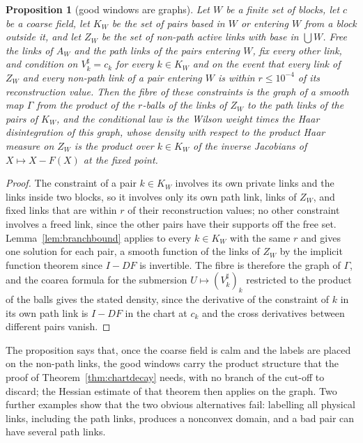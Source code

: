\documentclass[11pt]{amsart}
\newtheorem{proposition}[theorem]{Proposition}
\theoremstyle{definition}
\theoremstyle{remark}
\numberwithin{equation}{section}
\begin{document}
\begin{proposition}[good windows are graphs]\label{prop:graphlaw}
Let $W$ be a finite set of blocks, let $c$ be a coarse field, let $K_W$
be the set of pairs based in $W$ or entering $W$ from a block outside it,
and let $Z_W$ be the set of non-path active links with base in $\bigcup
W$. Free the links of $A_W$ and the path links of the pairs entering $W$,
fix every other link, and condition on $V^\sharp_k=c_k$ for every $k\in
K_W$ and on the event that every link of $Z_W$ and every non-path link of
a pair entering $W$ is within $r\le10^{-4}$ of its reconstruction value.
Then the fibre of these constraints is the graph of a smooth map $\Gamma$
from the product of the $r$-balls of the links of $Z_W$ to the path links
of the pairs of $K_W$, and the conditional law is the Wilson weight times
the Haar disintegration of this graph, whose density with respect to the
product Haar measure on $Z_W$ is the product over $k\in K_W$ of the
inverse Jacobians of $X\mapsto X-F(X)$ at the fixed point.
\end{proposition}

\begin{proof}
The constraint of a pair $k\in K_W$ involves its own private links and
the links inside two blocks, so it involves only its own path link, links
of $Z_W$, and fixed links that are within $r$ of their reconstruction
values; no other constraint involves a freed link, since the other pairs
have their supports off the free set. Lemma~\ref{lem:branchbound} applies
to every $k\in K_W$ with the same $r$ and gives one solution for each
pair, a smooth function of the links of $Z_W$ by the implicit function
theorem since $I-DF$ is invertible. The fibre is therefore the graph of $\Gamma$, and the coarea
formula for the submersion $U\mapsto(V^\sharp_k)_{k}$ restricted to the
product of the balls gives the stated density, since the derivative of the
constraint of $k$ in its own path link is $I-DF$ in the chart at $c_k$ and
the cross derivatives between different pairs vanish.
\end{proof}

The proposition says that, once the coarse field is calm and the labels
are placed on the non-path links, the good windows carry the product
structure that the proof of Theorem~\ref{thm:chartdecay} needs, with no
branch of the cut-off to discard; the Hessian estimate of that theorem
then applies on the graph. Two further examples show that the two obvious
alternatives fail: labelling all physical links, including the path links,
produces a nonconvex domain, and a bad pair can have several path links.
\end{document}

